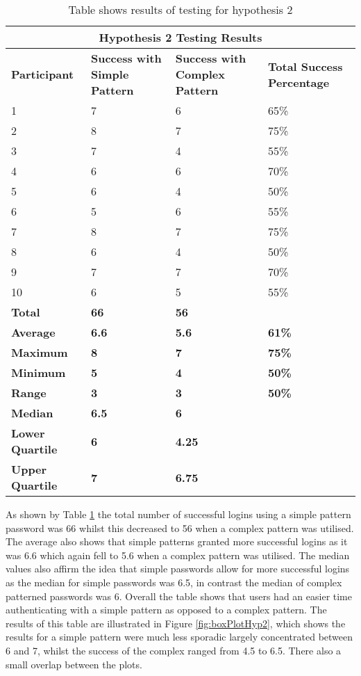 \documentclass{article}
\begin{document}
{
\begin{table} [H]
\centering
\begin{tabular}{ |p{2cm}|p{4cm}|p{4cm}| p{4cm} | }
\hline
\multicolumn{4}{|c|}{\textbf{Hypothesis 2 Testing Results}} \\
\hline
\textbf{Participant} & \textbf{Success with Simple Pattern} & \textbf{Success with Complex Pattern} & \textbf{Total Success Percentage} \\
\hline
1 & 7 & 6 & 65\% \\
\hline
2 & 8 & 7 & 75\% \\
\hline
3 & 7 & 4 & 55\% \\
\hline
4 & 6 & 6 & 70\%  \\
\hline
5 & 6 & 4 & 50\% \\
\hline
6 & 5 & 6 & 55\% \\
\hline
7 & 8 & 7 & 75\% \\
\hline
8 & 6 & 4 & 50\% \\
\hline
9 & 7 & 7 & 70\% \\
\hline
10 & 6 & 5 & 55\% \\
\hline
\textbf{Total} & \textbf{66} & \textbf{56} & \\
\hline
\textbf{Average} & \textbf{6.6} & \textbf{5.6} & \textbf{61\%} \\
\hline
\textbf{Maximum} & \textbf{8} & \textbf{7} & \textbf{75\%} \\
\hline
\textbf{Minimum} & \textbf{5} & \textbf{4} & \textbf{50\%} \\
\hline
\textbf{Range} & \textbf{3} & \textbf{3} & \textbf{50\%} \\
\hline
\textbf{Median} & \textbf{6.5} & \textbf{6} & \\
\hline
\textbf{Lower Quartile} & \textbf{6} & \textbf{4.25} & \\
\hline
\textbf{Upper Quartile} & \textbf{7} & \textbf{6.75} & \\
\hline
\end{tabular}
\caption{Table shows results of testing for hypothesis 2}
\label{table:2}
\end{table}
}

As shown by Table \ref{table:2} the total number of successful logins using a simple pattern password was 66 whilst this decreased to 56 when a complex pattern was utilised. The average also shows that simple patterns granted more successful logins as it was 6.6 which again fell to 5.6 when a complex pattern was utilised. The median values also affirm the idea that simple passwords allow for more successful logins as the median for simple passwords was 6.5, in contrast the median of complex patterned passwords was 6. Overall the table shows that users had an easier time authenticating with a simple pattern as opposed to a complex pattern. The results of this table are illustrated in Figure \ref{fig:boxPlotHyp2}, which shows the results for a simple pattern were much less sporadic largely concentrated between 6 and 7, whilst the success of the complex ranged from 4.5 to 6.5. There also a small overlap between the plots.  
\end{document}
